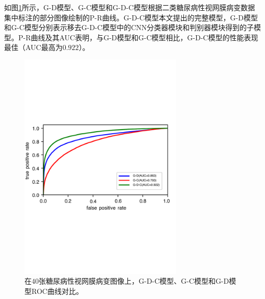 如图\ref{fig:roc_u_d_u_c_u_d_c_components}所示，G-D模型、G-C模型和G-D-C模型根据二类糖尿病性视网膜病变数据集中标注的部分图像绘制的P-R曲线。G-D-C模型本文提出的完整模型，G-D模型和G-C模型分别表示移去G-D-C模型中的CNN分类器模块和判别器模块得到的子模型。P-R曲线及其AUC表明，与G-D模型和G-C模型相比，G-D-C模型的性能表现最佳（AUC最高为$0.922$）。
\begin{figure}[H]
	\centering
	\includegraphics[width=0.7\textwidth]{figure/ROC_u_d_u_c_u_d_c_components}
	\caption[G-D-C模型、G-C模型和G-D模型ROC曲线对比]{在$40$张糖尿病性视网膜病变图像上，G-D-C模型、G-C模型和G-D模型ROC曲线对比。}
	\label{fig:roc_u_d_u_c_u_d_c_components}
\end{figure}
\endinput
